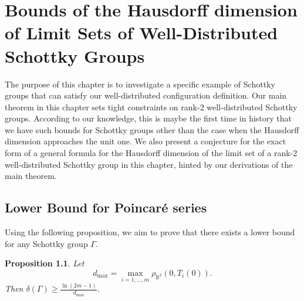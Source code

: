 \documentclass[12pt,oneside]{sfsuthesis}
\theoremstyle{plain} %
\newtheorem{proposition}[theorem]{Proposition}
\theoremstyle{definition}  %
\theoremstyle{remark}  %
\theoremstyle{plain}
\begin{document}
{\chapter{Bounds of the Hausdorff dimension of Limit Sets of Well-Distributed Schottky Groups}

The purpose of this chapter is to investigate a specific example of Schottky groups that can satisfy our well-distributed configuration definition. Our main theorem in this chapter sets tight constraints on rank-2 well-distributed Schottky groups. According to our knowledge, this is maybe the first time in history that we have such bounds for Schottky groups other than the case when the Hausdorff dimension approaches the unit one. We also present a conjecture for the exact form of a general formula for the Hausdorff dimension of the limit set of a rank-2 well-distributed Schottky group in this chapter, hinted by our derivations of the main theorem.


\section{Lower Bound for Poincar\'{e} series}


Using the following proposition, we aim to prove that there exists a lower bound for any Schottky group $\Gamma$.
\begin{proposition}\label{prop 1}
Let $$d_{\max} = \max_{i=1,..., m} \rho_{\mathbb{B}^2} (0, T_i (0)).$$
 Then $\delta (\Gamma) \ge \frac{\ln (2m-1)}{d_{\max}}$. 
\end{proposition}

}
\end{document}
